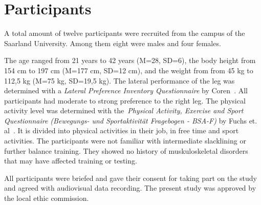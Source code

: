\section{Participants}\label{6_participants}
A total amount of twelve participants were recruited from the campus of the Saarland University.
Among them eight were males and four females.

The age ranged from 21 years to 42 years (M=28, SD=6), the body height from 154 cm to 197 cm (M=177 cm, SD=12 cm), and the weight from from 45 kg to 112,5 kg (M=75 kg, SD=19,5 kg).
The lateral performance of the leg was determined with a \textit{Lateral Preference Inventory Questionnaire} by Coren~\cite{Coren1993-lp}.
All participants had moderate to strong preference to the right leg.
The physical activity level was determined with the~\textit{Physical Activity, Exercise and Sport Questionnaire (Bewegungs- und Sportaktivität Fragebogen - BSA-F)} by Fuchs et. al~\cite{Fuchs2015-bsa}.
It is divided into physical activities in their job, in free time and sport activities.
The participants were not familiar with intermediate slacklining or further balance training. They showed no history of muskuloskeletal disorders that may have affected training or testing.

All participants were briefed and gave their consent for taking part on the study and agreed with audiovisual data recording.
The present study was approved by the local ethic commission.

